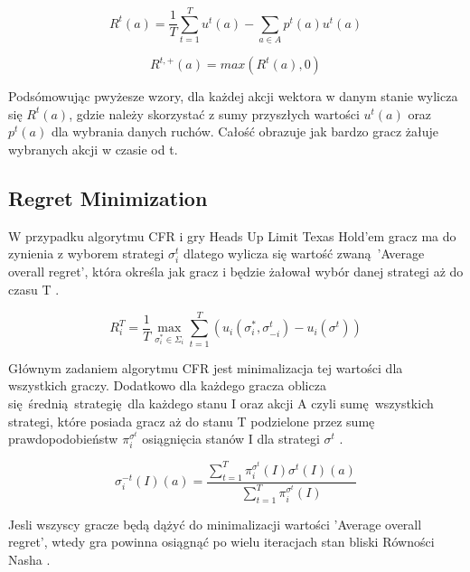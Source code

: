 \documentclass[12pt,oneside,a4paper]{report}
\begin{document}
\begin{equation}
   R^{t} (a) = \frac{1}{T} {\sum_{t=1}^{T} u^{t} (a)} - \sum_{a \in A} p^{t} (a) u^{t} (a)
\end{equation}

\vspace{1cm}
\begin{equation}
   R^{t,\text{+}}(a) = max(R^t(a),0)
\end{equation}

Podsómowując pwyżesze wzory, dla każdej akcji wektora w danym stanie wylicza się $R^{t}(a)$, gdzie
należy skorzystać z sumy przyszłych wartości $u^{t}(a)$ oraz $p^{t}(a)$ 
dla wybrania danych ruchów. Całość obrazuje jak bardzo gracz żałuje wybranych
akcji w czasie od t.

\subsection{Regret Minimization}

W przypadku algorytmu CFR i gry Heads Up Limit Texas Hold'em gracz ma do zynienia z wyborem strategi
$\sigma_{i}^{t}$ dlatego wylicza się wartość zwaną 'Average overall regret', która określa jak gracz
i będzie żałował wybór danej strategi aż do czasu T \cite{rmg}.

\begin{equation}
   R^{T}_{i} = \frac{1}{T} \max_{\sigma^{*}_{i} \in \Sigma_{i}} \sum_{t=1}^{T}
   \left(u_{i}\left(\sigma_{i}^{*}, \sigma_{-i}^{t}\right) - u_{i}(\sigma^{t})\right)
\end{equation}

Głównym zadaniem algorytmu CFR jest minimalizacja tej wartości dla wszystkich graczy.
Dodatkowo dla każdego gracza oblicza się średnią strategię dla 
każdego stanu I oraz akcji A czyli sumę wszystkich strategi, które posiada gracz aż do stanu T
podzielone przez sumę prawdopodobieństw $\pi^{\sigma^{t}}_{i}$ osiągnięcia stanów I dla
strategi $\sigma^{t}$ \cite{rmg}.

\begin{equation}
   \sigma^{-t}_{i} \left(I\right) \left(a\right) = \frac{\sum^{T}_{t=1} \pi^{\sigma^{t}}_{i}
   (I)\sigma^{t}(I)(a)}{\sum^{T}_{t=1} \pi^{\sigma^{t}}_{i}(I)}
\end{equation}

Jesli wszyscy gracze będą dążyć do minimalizacji wartości 'Average overall regret', wtedy gra
powinna osiągnąć po wielu iteracjach stan bliski Równości Nasha \cite{rmg}.
\end{document}
